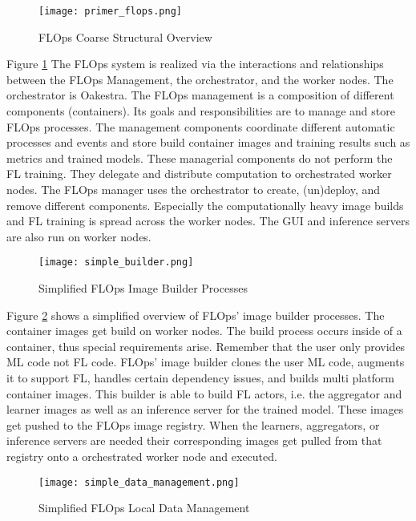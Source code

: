\begin{figure}[h]
    \centering
    \texttt{[image: primer\_flops.png]}
    \caption{FLOps Coarse Structural Overview}
    \label{fig:flops_structure_overview}
\end{figure}

Figure \ref{fig:flops_structure_overview}
The FLOps system is realized via the interactions and relationships between the FLOps Management, the orchestrator, and the worker nodes.
The orchestrator is Oakestra.
The FLOps management is a composition of different components (containers).
Its goals and responsibilities are to manage and store FLOps processes.
The management components coordinate different automatic processes and events and store build container images and training results such as metrics and trained models.
These managerial components do not perform the FL training.
They delegate and distribute computation to orchestrated worker nodes.
The FLOps manager uses the orchestrator to create, (un)deploy, and remove different components.
Especially the computationally heavy image builds and FL training is spread across the worker nodes.
The GUI and inference servers are also run on worker nodes.

\begin{figure}[h]
    \centering
    \texttt{[image: simple\_builder.png]}
    \caption{Simplified FLOps Image Builder Processes}
    \label{fig:flops_simple_image_builder}
\end{figure}

Figure \ref{fig:flops_simple_image_builder} shows a simplified overview of FLOps' image builder processes.
The container images get build on worker nodes.
The build process occurs inside of a container, thus special requirements arise.
Remember that the user only provides ML code not FL code.
FLOps' image builder clones the user ML code, augments it to support FL, handles certain dependency issues, and builds multi platform container images.
This builder is able to build FL actors, i.e. the aggregator and learner images as well as an inference server for the trained model.
These images get pushed to the FLOps image registry.
When the learners, aggregators, or inference servers are needed their corresponding images get pulled from that registry onto a orchestrated worker node and executed.

\begin{figure}[h]
    \centering
    \texttt{[image: simple\_data\_management.png]}
    \caption{Simplified FLOps Local Data Management}
    \label{fig:flops_simple_data_management}
\end{figure}

